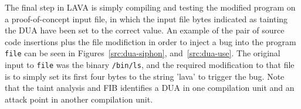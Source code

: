 The final step in LAVA is simply compiling and testing the modified program on a proof-of-concept input file, in which the input file bytes indicated as tainting the DUA have been set to the correct value.
An example of the pair of source code insertions plus the file modifiction in order to inject a bug into the program \verb+file+ can be seen in Figures~\ref{src:dua-siphon}, and~\ref{src:dua-use}.
The original input to \verb+file+ was the binary \verb+/bin/ls+, and the required modification to that file is to simply set its first four bytes to the string 'lava' to trigger the bug. 
Note that the taint analysis and FIB identifies a DUA in one compilation unit and an attack point in another compilation unit.  
